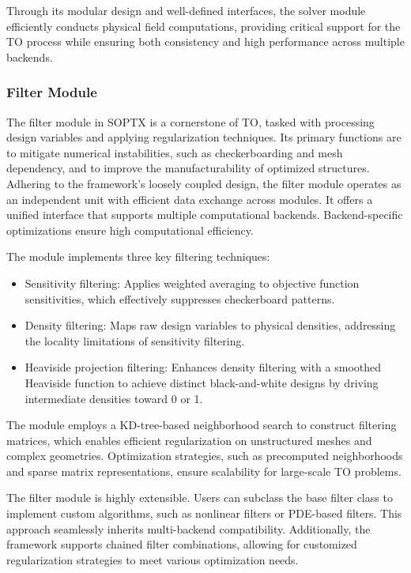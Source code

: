 \documentclass[mathpazo]{cicp}
\begin{document}
Through its modular design and well-defined interfaces, the solver module efficiently conducts physical field computations, providing critical support for the TO process while ensuring both consistency and high performance across multiple backends.

\subsubsection{Filter Module}
The filter module in SOPTX is a cornerstone of TO, tasked with processing design variables and applying regularization techniques. Its primary functions are to mitigate numerical instabilities, such as checkerboarding and mesh dependency, and to improve the manufacturability of optimized structures. Adhering to the framework’s loosely coupled design, the filter module operates as an independent unit with efficient data exchange across modules. It offers a unified interface that supports multiple computational backends. Backend-specific optimizations ensure high computational efficiency.

The module implements three key filtering techniques:
\begin{itemize}
	\item Sensitivity filtering: Applies weighted averaging to objective function sensitivities, which effectively suppresses checkerboard patterns.
	\item Density filtering: Maps raw design variables to physical densities, addressing the locality limitations of sensitivity filtering.
	\item Heaviside projection filtering: Enhances density filtering with a smoothed Heaviside function to achieve distinct black-and-white designs by driving intermediate densities toward 0 or 1.
\end{itemize}

The module employs a KD-tree-based neighborhood search to construct filtering matrices, which enables efficient regularization on unstructured meshes and complex geometries. Optimization strategies, such as precomputed neighborhoods and sparse matrix representations, ensure scalability for large-scale TO problems.

The filter module is highly extensible. Users can subclass the base filter class to implement custom algorithms, such as nonlinear filters or PDE-based filters. This approach seamlessly inherits multi-backend compatibility. Additionally, the framework supports chained filter combinations, allowing for customized regularization strategies to meet various optimization needs.
\end{document}
